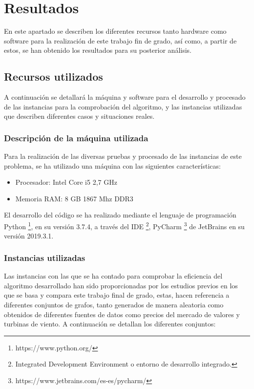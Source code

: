
\chapter{Resultados} %

\label{Chapter5} %


En este apartado se describen los diferentes recursos tanto hardware como software para la realización de este trabajo fin de grado, así como, a partir de estos, se han obtenido los resultados para su posterior análisis.

\section{Recursos utilizados}
A continuación se detallará la máquina  y software para el desarrollo y procesado de las instancias para la comprobación del algoritmo, y las instancias utilizadas que describen diferentes casos y situaciones reales.

\subsection{Descripción de la máquina utilizada}
Para la realización de las diversas pruebas y procesado de las instancias de este problema, se ha utilizado una máquina con las siguientes características:

\begin{itemize}

\item Procesador: Intel Core i5 2,7 GHz
\item Memoria RAM: 8 GB 1867 Mhz DDR3
\end{itemize}

El desarrollo del código se ha realizado mediante el lenguaje de programación Python \footnote{https://www.python.org/}, en su versión 3.7.4, a través del IDE \footnote{Integrated Development Environment o entorno de desarrollo integrado.}, PyCharm \footnote{https://www.jetbrains.com/es-es/pycharm/} de JetBrains en su versión 2019.3.1.

\subsection{Instancias utilizadas}
Las instancias con las que se ha contado para comprobar la eficiencia del algoritmo desarrollado han sido proporcionadas por los estudios previos en los que se basa y compara este trabajo final de grado, estas, hacen referencia a diferentes conjuntos de grafos, tanto generados de manera aleatoria como obtenidos de diferentes fuentes de datos como precios del mercado de valores y turbinas de viento. A continuación se detallan los diferentes conjuntos:


